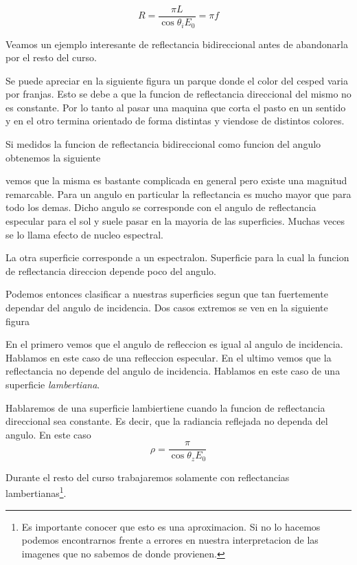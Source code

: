 \begin{equation}
  R = \frac{\pi L}{\cos\theta_i E_0} = \pi f
\end{equation}

\begin{exa}
  Veamos un ejemplo interesante de reflectancia bidireccional antes de abandonarla
  por el resto del curso.

  Se puede apreciar en la siguiente figura un parque donde el color del cesped
  varia por franjas. Esto se debe a que la funcion de reflectancia direccional
  del mismo no es constante. Por lo tanto al pasar una maquina que corta el
  pasto en un sentido y en el otro termina orientado de forma distintas y
  viendose de distintos colores.

  Si medidos la funcion de reflectancia bidireccional como funcion del angulo
  obtenemos la siguiente

  vemos que la misma es bastante complicada en general pero existe una magnitud
  remarcable. Para un angulo en particular la reflectancia es mucho mayor que
  para todo los demas. Dicho angulo se corresponde con el angulo de reflectancia
  especular para el sol y suele pasar en la mayoria de las superficies. Muchas
  veces se lo llama efecto de nucleo espectral.

  La otra superficie corresponde a un espectralon. Superficie para la cual la
  funcion de reflectancia direccion depende poco del angulo.
\end{exa}

Podemos entonces clasificar a nuestras superficies segun que tan fuertemente
dependar del angulo de incidencia. Dos casos extremos se ven en la siguiente
figura

En el primero vemos que el angulo de refleccion es igual al angulo de
incidencia. Hablamos en este caso de una refleccion especular. En el ultimo
vemos que la reflectancia no depende del angulo de incidencia. Hablamos en este
caso de una superficie \emph{lambertiana}.

\begin{dex}
  Hablaremos de una superficie lambiertiene cuando la funcion de reflectancia
  direccional sea constante. Es decir, que la radiancia reflejada no dependa del
  angulo. En este caso
  \begin{equation}
    \rho = \frac{\pi}{\cos \theta_z E_0}
  \end{equation}
\end{dex}

Durante el resto del curso trabajaremos solamente con reflectancias
lambertianas\footnote{Es importante conocer que esto es una aproximacion. Si no
lo hacemos podemos encontrarnos frente a errores en nuestra interpretacion de
las imagenes que no sabemos de donde provienen.}.

